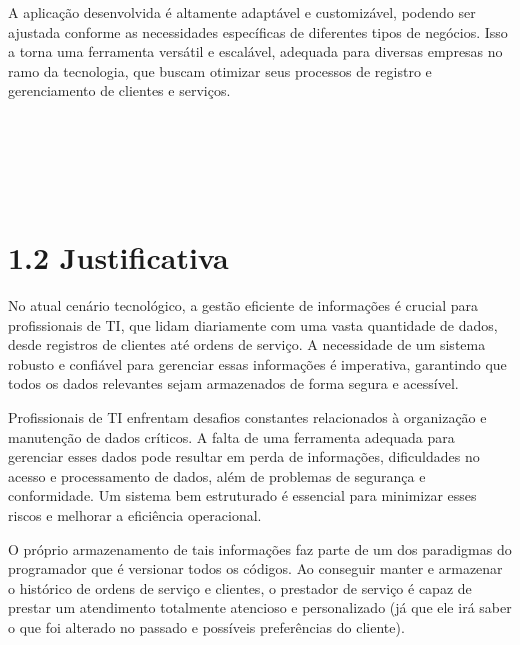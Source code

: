 A aplicação desenvolvida é altamente adaptável e customizável, podendo ser ajustada conforme as necessidades específicas de diferentes tipos de negócios. Isso a torna uma ferramenta versátil e escalável, adequada para diversas empresas no ramo da tecnologia, que buscam otimizar seus processos de registro e gerenciamento de clientes e serviços.
\\\\\\\\\\\\
\section*{1.2 Justificativa}

No atual cenário tecnológico, a gestão eficiente de informações é crucial para profissionais de TI, que lidam diariamente com uma vasta quantidade de dados, desde registros de clientes até ordens de serviço. A necessidade de um sistema robusto e confiável para gerenciar essas informações é imperativa, garantindo que todos os dados relevantes sejam armazenados de forma segura e acessível.

Profissionais de TI enfrentam desafios constantes relacionados à organização e manutenção de dados críticos. A falta de uma ferramenta adequada para gerenciar esses dados pode resultar em perda de informações, dificuldades no acesso e processamento de dados, além de problemas de segurança e conformidade. Um sistema bem estruturado é essencial para minimizar esses riscos e melhorar a eficiência operacional.

O próprio armazenamento de tais informações faz parte de um dos paradigmas do programador que é versionar todos os códigos. Ao conseguir manter e armazenar o histórico de ordens de serviço e clientes, o prestador de serviço é capaz de prestar um atendimento totalmente atencioso e personalizado (já que ele irá saber o que foi alterado no passado e possíveis preferências do cliente).\\\\\\\\\\\\\\\\\\\\\\\\\\\\\\\\\\\\\\

